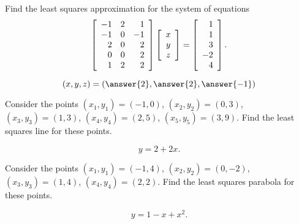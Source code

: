 \documentclass{ximera}
\author{Zack Reed}
\begin{document}

\begin{problem}
  Find the least squares approximation for the system of equations
  \begin{equation*}
    \startmat{rrr}
      -1 & 2 & 1 \\
      -1 & 0 & -1 \\
      2 & 0 & 2 \\
      0 & 0 & 2 \\
      1 & 2 & 2 \\
    \stopmat
    \startmat{c} x \\ y \\ z \stopmat
    =
    \startmat{r} 1 \\ 1 \\ 3 \\ -2 \\ 4 \stopmat.
  \end{equation*}

    $$(x,y,z) = (\answer{2},\answer{2},\answer{-1})$$

\end{problem}

\begin{problem}
  Consider the points $(x_1,y_1) = (-1,0)$, $(x_2,y_2) = (0,3)$,
  $(x_3,y_3) = (1,3)$, $(x_4,y_4) = (2,5)$, $(x_5,y_5) = (3,9)$.  Find
  the least squares line for these points.

    $$y = 2+2x.$$

\end{problem}

\begin{problem}
  Consider the points $(x_1,y_1) = (-1,4)$, $(x_2,y_2) = (0,-2)$,
  $(x_3,y_3) = (1,4)$, $(x_4,y_4) = (2,2)$.  Find the least squares
  parabola for these points.

    $$y = 1-x+x^2.$$

\end{problem}
\end{document}
